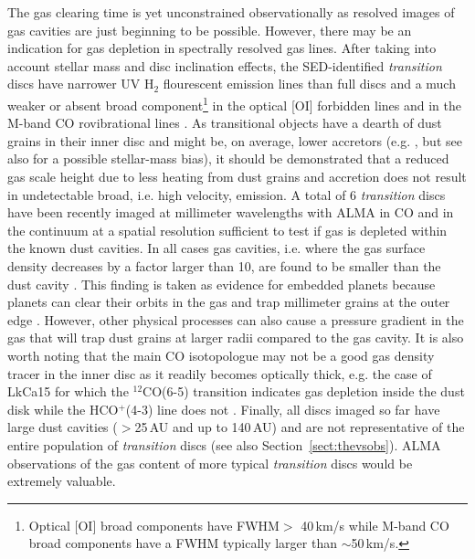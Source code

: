 \documentclass{rsos}
\begin{document}
The gas clearing time is yet unconstrained observationally as resolved images of gas cavities are just beginning to be possible. However, there may be an indication for gas depletion in spectrally resolved gas lines. After taking into account stellar mass and disc inclination effects, the SED-identified {\it transition} discs have narrower UV H$_2$ flourescent emission lines 
than full discs \cite{2015ApJ...812...41H} and a much weaker or absent broad component\footnote{Optical [OI] broad components have FWHM$>$ 40\,km/s while M-band CO broad components have a FWHM typically larger than $\sim$50\,km/s.} in the optical [OI] forbidden lines \cite{2016ApJ...831..169S} and in the M-band CO rovibrational lines 
\cite{2009ApJ...699..330S,2015ApJ...809..167B}. As transitional objects have a dearth of dust grains in their inner disc and might be, on average, lower accretors (e.g. \cite{2015MNRAS.450.3559N}, but see also \cite{2014ApJ...787..153K} for a possible stellar-mass bias), it should be demonstrated that a reduced gas scale height due to less heating from dust grains and accretion does not result in undetectable broad, i.e. high velocity, emission.
A total of 6 {\it transition} discs have been recently imaged at millimeter wavelengths with ALMA in CO and in the continuum at a spatial resolution sufficient to test if gas is depleted within the known dust cavities. In all cases gas cavities, i.e. where the gas surface density decreases by a factor larger than 10, are found to be smaller than the dust cavity \cite{2016A&A...585A..58V}. 
This finding is taken as evidence for embedded planets because planets can clear their orbits in the gas and trap millimeter grains at the outer edge \cite{2015A&A...573A...9P}. However, other physical processes can also cause a pressure gradient in the gas that will trap dust grains at larger radii compared to the gas cavity. 
It is also worth noting that the main CO isotopologue may not be a good gas density tracer in the inner disc as it readily becomes optically thick, e.g. the case of LkCa15 for which the $^{12}$CO(6-5) transition indicates gas depletion inside the dust disk while the HCO$^+$(4-3) line does not \cite{2016ApJ...833..260D}.
Finally, all discs imaged so far have large dust cavities ($>$25\,AU and up to 140\,AU) and are not representative of the entire population of {\it transition} discs \cite{2016A&A...592A.126V} (see also  Section~\ref{sect:thevsobs}). ALMA observations of the gas content of more typical {\it transition} discs would be extremely valuable. 
\end{document}
